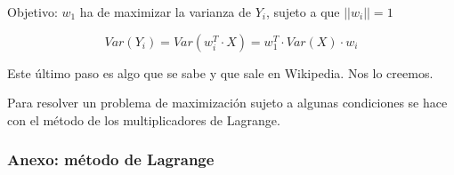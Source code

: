 \documentclass[a4paper,10pt]{article}
\begin{document}
Objetivo: $w_1$ ha de maximizar la varianza de $Y_i$, sujeto a que $||w_i|| = 1$

\begin{equation}
  Var(Y_i) = Var(w_i^T \cdot X) = w_1^T \cdot Var(X) \cdot w_i
\end{equation}

Este último paso es algo que se sabe y que sale en Wikipedia. Nos lo creemos.

Para resolver un problema de maximización sujeto a algunas condiciones se hace con el método de los multiplicadores de Lagrange.

\subsubsection*{Anexo: método de Lagrange}
\end{document}
